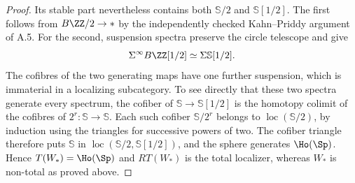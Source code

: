 \begin{proof}
Its stable part nevertheless contains both $\mathbb S/2$ and $\mathbb S[1/2]$. The first follows from $B\ZZ/2\to *$ by the independently checked Kahn--Priddy argument of A.5. For the second, suspension spectra preserve the circle telescope and give
\[
 \Sigma^\infty B\ZZ[1/2]\simeq\Sigma\mathbb S[1/2].
\]
The cofibres of the two generating maps have one further suspension, which is immaterial in a localizing subcategory. To see directly that these two spectra generate every spectrum, the cofiber of $\mathbb S\to\mathbb S[1/2]$ is the homotopy colimit of the cofibres of $2^r:\mathbb S\to\mathbb S$. Each such cofiber $\mathbb S/2^r$ belongs to $\operatorname{loc}(\mathbb S/2)$, by induction using the triangles for successive powers of two. The cofiber triangle therefore puts $\mathbb S$ in $\operatorname{loc}(\mathbb S/2,\mathbb S[1/2])$, and the sphere generates $\Ho(\Sp)$. Hence $T(W_*)=\Ho(\Sp)$ and $RT(W_*)$ is the total localizer, whereas $W_*$ is non-total as proved above.
\end{proof}

